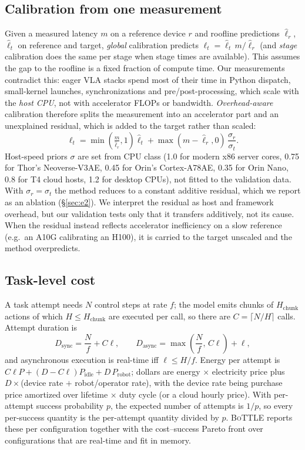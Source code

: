 \documentclass[10pt]{article}
\newcommand{\bottle}{\textsc{BoTTLE}}
\begin{document}
\subsection{Calibration from one measurement}
Given a measured latency $m$ on a reference device $r$ and roofline predictions $\hat\ell_r$,
$\hat\ell_t$ on reference and target, \emph{global} calibration predicts
$\ell_t = \hat\ell_t\, m/\hat\ell_r$ (and \emph{stage} calibration does the same per stage when
stage times are available). This assumes the gap to the roofline is a fixed fraction of compute
time. Our measurements contradict this: eager VLA stacks spend most of their time in Python
dispatch, small-kernel launches, synchronizations and pre/post-processing, which scale with the
\emph{host CPU}, not with accelerator FLOPs or bandwidth. \emph{Overhead-aware} calibration
therefore splits the measurement into an accelerator part and an unexplained residual, which is
added to the target rather than scaled:
\begin{equation}
\ell_t = \min\!\left(\tfrac{m}{\hat\ell_r},1\right)\hat\ell_t + \max(m-\hat\ell_r,0)\,\frac{\sigma_r}{\sigma_t}.
\end{equation}
Host-speed priors $\sigma$ are set from CPU class (1.0 for modern x86 server cores, 0.75 for Thor's
Neoverse-V3AE, 0.45 for Orin's Cortex-A78AE, 0.35 for Orin Nano, 0.8 for T4 cloud hosts, 1.2
for desktop CPUs), not fitted to the validation data. With $\sigma_r{=}\sigma_t$ the method reduces
to a constant additive residual, which we report as an ablation (\S\ref{sec:e2}). We interpret the
residual as host and framework overhead, but our validation tests only that it transfers
additively, not its cause. When the residual instead reflects accelerator inefficiency on a
slow reference (e.g.\ an A10G calibrating an H100), it is carried to the target unscaled and the
method overpredicts.

\subsection{Task-level cost}
A task attempt needs $N$ control steps at rate $f$; the model emits chunks of $H_\text{chunk}$
actions of which $H \le H_\text{chunk}$ are executed per call, so there are $C=\lceil N/H\rceil$
calls. Attempt duration is
\begin{equation}
D_\text{sync} = \frac{N}{f} + C\ell, \qquad D_\text{async} = \max\!\left(\frac{N}{f},\,C\ell\right) + \ell,
\end{equation}
and asynchronous execution is real-time iff $\ell \le H/f$. Energy per attempt is
$C\ell P + (D - C\ell)P_\text{idle} + D\,P_\text{robot}$; dollars are energy $\times$ electricity price
plus $D\times$(device rate $+$ robot/operator rate), with the device rate being purchase price
amortized over lifetime $\times$ duty cycle (or a cloud hourly price). With per-attempt success
probability $p$, the expected number of attempts is $1/p$, so every per-success quantity is the
per-attempt quantity divided by $p$. \bottle{} reports these per configuration together with the
cost--success Pareto front over configurations that are real-time and fit in memory.
\end{document}
